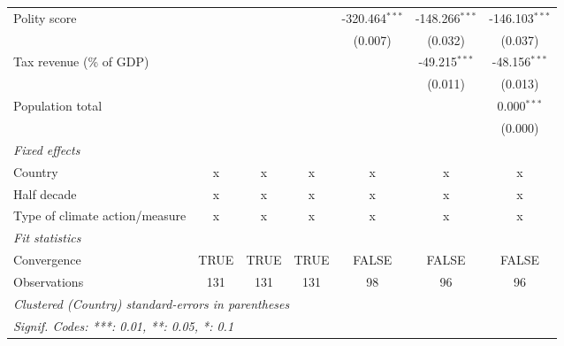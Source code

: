 \begin{tabular}{lcccccc}
   Polity score                                                     &          &          &          & -320.464$^{***}$   & -148.266$^{***}$   & -146.103$^{***}$\\   
                                                                    &          &          &          & (0.007)            & (0.032)            & (0.037)\\   
   Tax revenue (\% of GDP)                                          &          &          &          &                    & -49.215$^{***}$    & -48.156$^{***}$\\   
                                                                    &          &          &          &                    & (0.011)            & (0.013)\\   
   Population total                                                 &          &          &          &                    &                    & 0.000$^{***}$\\   
                                                                    &          &          &          &                    &                    & (0.000)\\   
   \emph{Fixed effects}\\
   Country                                                          & x        & x        & x        & x                  & x                  & x\\  
   Half decade                                                      & x        & x        & x        & x                  & x                  & x\\  
   Type of climate action/measure                                   & x        & x        & x        & x                  & x                  & x\\  
   \midrule \emph{Fit statistics}\\
   Convergence                                                      &TRUE      & TRUE     & TRUE     & FALSE              & FALSE              & FALSE\\  
   Observations                                                     & 131      & 131      & 131      & 98                 & 96                 & 96\\  
   \midrule
   \multicolumn{7}{l}{\emph{Clustered (Country) standard-errors in parentheses}}\\
   \multicolumn{7}{l}{\emph{Signif. Codes: ***: 0.01, **: 0.05, *: 0.1}}\\
\end{tabular}
\par\endgroup


